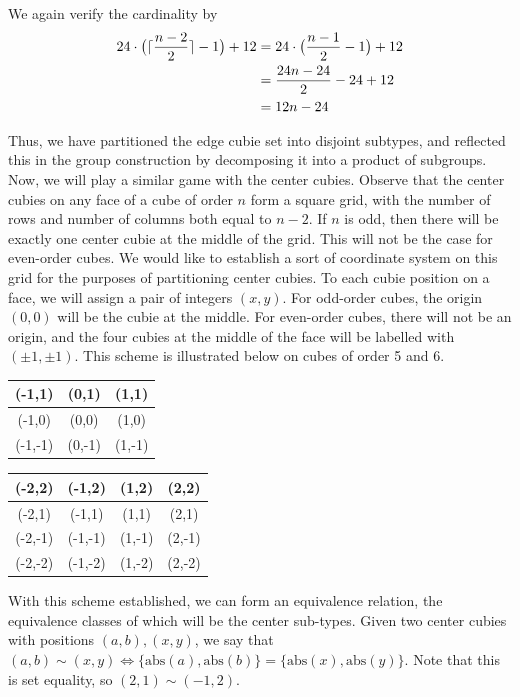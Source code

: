 \documentclass[10pt,letterpaper]{report}
\DeclarePairedDelimiter\ceil{\lceil}{\rceil}
\begin{document}
We again verify the cardinality by \begin{align*}
24 \cdot \big( \ceil{\frac{n-2}{2}} - 1 \big) + 12
&= 24 \cdot \big(\frac{n-1}{2} - 1 \big) + 12 \\
&=\frac{24n - 24}{2} - 24 + 12 \\
&= 12n - 24
\end{align*}

Thus, we have partitioned the edge cubie set into disjoint subtypes, and reflected this in the group construction by decomposing it into a product of subgroups. \\

Now, we will play a similar game with the center cubies.  Observe that the center cubies on any face of a cube of order $n$ form a square grid, with the number of rows and number of columns both equal to $n-2$.  If $n$ is odd, then there will be exactly one center cubie at the middle of the grid.  This will not be the case for even-order cubes.  We would like to establish a sort of coordinate system on this grid for the purposes of partitioning center cubies.  To each cubie position on a face, we will assign a pair of integers $(x,y)$.  For odd-order cubes, the origin $(0,0)$ will be the cubie at the middle.  For even-order cubes, there will not be an origin, and the four cubies at the middle of the face will be labelled with $(\pm 1, \pm 1)$.  This scheme is illustrated below on cubes of order 5 and 6. \\

\begin{tabular}{|c|c|c|}
\hline 
(-1,1) & (0,1) & (1,1) \\ 
\hline 
(-1,0) & (0,0) & (1,0) \\ 
\hline 
(-1,-1) & (0,-1) & (1,-1) \\ 
\hline 
\end{tabular}
\quad \quad
\begin{tabular}{|c|c|c|c|}
\hline 
(-2,2) & (-1,2) & (1,2) & (2,2) \\ 
\hline 
(-2,1) & (-1,1) & (1,1) & (2,1) \\ 
\hline 
(-2,-1) & (-1,-1) & (1,-1) & (2,-1) \\ 
\hline 
(-2,-2) & (-1,-2) & (1,-2) & (2,-2) \\ 
\hline 
\end{tabular} 

With this scheme established, we can form an equivalence relation, the equivalence classes of which will be the center sub-types.  Given two center cubies with positions $(a,b),(x,y)$, we say that $(a,b) \sim (x,y) \Leftrightarrow \{\text{abs}(a), \text{abs}(b)\} = \{\text{abs}(x), \text{abs}(y)\}$.  Note that this is set equality, so $(2,1) \sim (-1,2)$.
\end{document}
